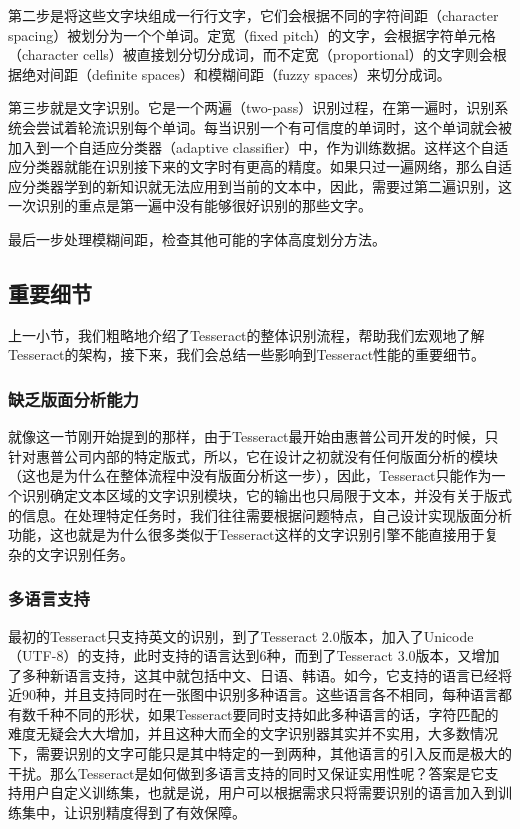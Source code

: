 第二步是将这些文字块组成一行行文字，它们会根据不同的字符间距（character spacing）被划分为一个个单词。定宽（fixed pitch）的文字，会根据字符单元格（character cells）被直接划分切分成词，而不定宽（proportional）的文字则会根据绝对间距（definite spaces）和模糊间距（fuzzy spaces）来切分成词。

第三步就是文字识别。它是一个两遍（two-pass）识别过程，在第一遍时，识别系统会尝试着轮流识别每个单词。每当识别一个有可信度的单词时，这个单词就会被加入到一个自适应分类器（adaptive classifier）中，作为训练数据。这样这个自适应分类器就能在识别接下来的文字时有更高的精度。如果只过一遍网络，那么自适应分类器学到的新知识就无法应用到当前的文本中，因此，需要过第二遍识别，这一次识别的重点是第一遍中没有能够很好识别的那些文字。

最后一步处理模糊间距，检查其他可能的字体高度划分方法。

\subsection{重要细节}
上一小节，我们粗略地介绍了Tesseract的整体识别流程，帮助我们宏观地了解Tesseract的架构，接下来，我们会总结一些影响到Tesseract性能的重要细节。

\subsubsection*{缺乏版面分析能力}
就像这一节刚开始提到的那样，由于Tesseract最开始由惠普公司开发的时候，只针对惠普公司内部的特定版式，所以，它在设计之初就没有任何版面分析的模块（这也是为什么在整体流程中没有版面分析这一步），因此，Tesseract只能作为一个识别确定文本区域的文字识别模块，它的输出也只局限于文本，并没有关于版式的信息。在处理特定任务时，我们往往需要根据问题特点，自己设计实现版面分析功能，这也就是为什么很多类似于Tesseract这样的文字识别引擎不能直接用于复杂的文字识别任务。

\subsubsection*{多语言支持}
最初的Tesseract只支持英文的识别，到了Tesseract 2.0版本，加入了Unicode（UTF-8）的支持，此时支持的语言达到6种，而到了Tesseract 3.0版本，又增加了多种新语言支持，这其中就包括中文、日语、韩语。如今，它支持的语言已经将近90种，并且支持同时在一张图中识别多种语言。这些语言各不相同，每种语言都有数千种不同的形状，如果Tesseract要同时支持如此多种语言的话，字符匹配的难度无疑会大大增加，并且这种大而全的文字识别器其实并不实用，大多数情况下，需要识别的文字可能只是其中特定的一到两种，其他语言的引入反而是极大的干扰。那么Tesseract是如何做到多语言支持的同时又保证实用性呢？答案是它支持用户自定义训练集，也就是说，用户可以根据需求只将需要识别的语言加入到训练集中，让识别精度得到了有效保障。


